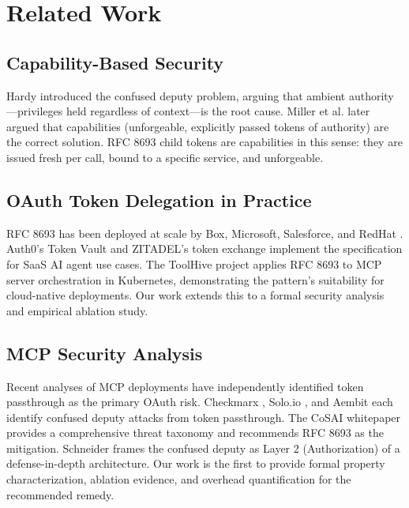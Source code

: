 \documentclass[journal]{IEEEtran}
\begin{document}
\section{Related Work}
\label{sec:related}

\subsection{Capability-Based Security}

Hardy \cite{hardy1988} introduced the confused deputy problem, arguing that
ambient authority---privileges held regardless of context---is the root cause.
Miller et al. \cite{miller2003} later argued that capabilities (unforgeable,
explicitly passed tokens of authority) are the correct solution. RFC 8693 child
tokens are capabilities in this sense: they are issued fresh per call, bound to
a specific service, and unforgeable.

\subsection{OAuth Token Delegation in Practice}

RFC 8693 \cite{rfc8693} has been deployed at scale by Box, Microsoft, Salesforce,
and RedHat \cite{rfc8693_deploy}. Auth0's Token Vault \cite{auth0_token_vault}
and ZITADEL's token exchange \cite{zitadel_te} implement the specification for
SaaS AI agent use cases. The ToolHive project \cite{toolhive} applies RFC 8693
to MCP server orchestration in Kubernetes, demonstrating the pattern's suitability
for cloud-native deployments. Our work extends this to a formal security analysis
and empirical ablation study.

\subsection{MCP Security Analysis}

Recent analyses of MCP deployments have independently identified token passthrough
as the primary OAuth risk. Checkmarx \cite{checkmarx_mcp}, Solo.io \cite{solo_mcp},
and Aembit \cite{aembit_mcp} each identify confused deputy attacks from token
passthrough. The CoSAI whitepaper \cite{cosai_mcp} provides a comprehensive threat
taxonomy and recommends RFC 8693 as the mitigation. Schneider \cite{schneider_mcp}
frames the confused deputy as Layer 2 (Authorization) of a defense-in-depth
architecture. Our work is the first to provide formal property characterization,
ablation evidence, and overhead quantification for the recommended remedy.
\end{document}
